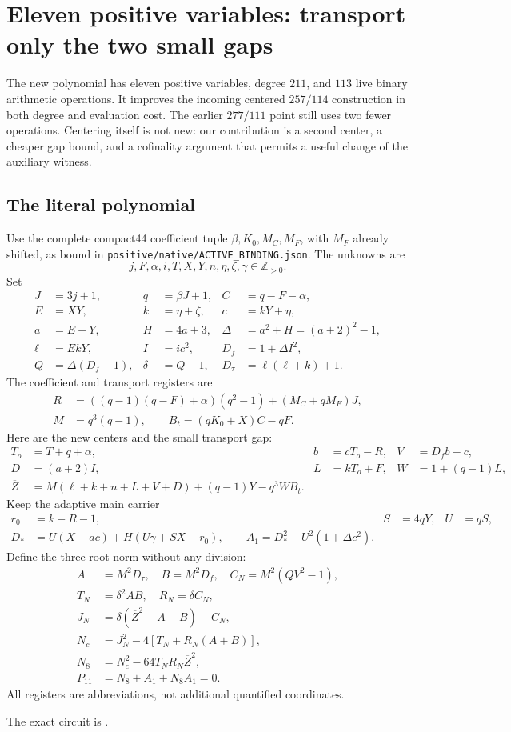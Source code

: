 \section{Eleven positive variables: transport only the two small gaps}
\label{sec:positive211}
The new polynomial has eleven positive variables, degree $211$, and $113$
live binary arithmetic operations.  It improves the incoming centered
$257/114$ construction in both degree and evaluation cost.  The earlier
$277/111$ point still uses two fewer operations.  Centering itself is not
new: our contribution is a second center, a cheaper gap bound, and a
cofinality argument that permits a useful change of the auxiliary witness.

\subsection{The literal polynomial}
Use the complete compact44 coefficient tuple
$\beta,K_0,M_C,M_F$, with $M_F$ already shifted, as bound in
\texttt{positive/native/ACTIVE\_BINDING.json}.  The unknowns are
\[
 j,F,\alpha,i,T,X,Y,n,\eta,\zeta,\gamma\in\mathbb Z_{>0}.
\]
Set
\begin{align*}
 J&=3j+1,&q&=\beta J+1,&C&=q-F-\alpha,\\
 E&=XY,&k&=\eta+\zeta,&c&=kY+\eta,\\
 a&=E+Y,&H&=4a+3,&\Delta&=a^2+H=(a+2)^2-1,\\
 \ell&=EkY,&I&=ic^2,&D_f&=1+\Delta I^2,\\
 Q&=\Delta(D_f-1),&\delta&=Q-1,&D_\tau&=\ell(\ell+k)+1.
\end{align*}
The coefficient and transport registers are
\begin{align*}
 R&=((q-1)(q-F)+\alpha)(q^2-1)+(M_C+qM_F)J,\\
 M&=q^3(q-1),\qquad B_t=(qK_0+X)C-qF.
\end{align*}
Here are the new centers and the small transport gap:
\begin{align*}
 T_o&=T+q+\alpha,& b&=cT_o-R,&V&=D_f b-c,\\
 D&=(a+2)I,&L&=kT_o+F,&W&=1+(q-1)L,\\
 \overline Z&=M(\ell+k+n+L+V+D)+(q-1)Y-q^3WB_t.
\end{align*}
Keep the adaptive main carrier
\begin{align*}
 r_0&=k-R-1,&S&=4qY,&U&=qS,\\
 D_*&=U(X+ac)+H(U\gamma+SX-r_0),\qquad
 A_1=D_*^2-U^2(1+\Delta c^2).
\end{align*}
Define the three-root norm without any division:
\begin{align*}
 A&=M^2D_\tau,\quad B=M^2D_f,\quad C_N=M^2(QV^2-1),\\
 T_N&=\delta^2AB,\quad R_N=\delta C_N,\\
 J_N&=\delta(\overline Z^2-A-B)-C_N,\\
 N_c&=J_N^2-4[T_N+R_N(A+B)],\\
 N_8&=N_c^2-64T_NR_N\overline Z^2,\\
 \boxed{P_{11}}&\boxed{=N_8+A_1+N_8A_1=0.}
\end{align*}
All registers are abbreviations, not additional quantified coordinates.
\par The exact circuit is .

